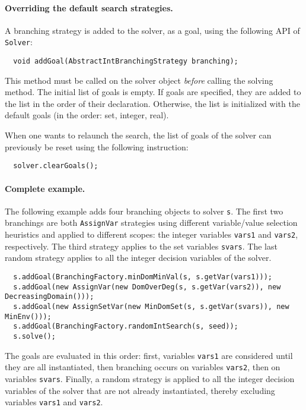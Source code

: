\paragraph{Overriding the default search strategies.}
A branching strategy is added to the solver, as a goal, using the following API of \texttt{Solver}:
\begin{lstlisting}
  void addGoal(AbstractIntBranchingStrategy branching);
\end{lstlisting}
This method must be called on the solver object \emph{before} calling the solving method.
The initial list of goals is empty. If goals are specified, they are added to the list in the order of their declaration.
Otherwise, the list is initialized with the default goals (in the order: set, integer, real).

When one wants to relaunch the search, the list of goals of the solver can previously be reset using the following instruction:
\begin{lstlisting}
  solver.clearGoals();
\end{lstlisting} 

\paragraph{Complete example.}
The following example adds four branching objects to solver \texttt{s}. 
The first two branchings are both \texttt{AssignVar} strategies using different variable/value selection heuristics and applied to different scopes: the integer variables \texttt{vars1} and \texttt{vars2}, respectively. The third strategy applies to the set variables \texttt{svars}. The last random strategy applies to all the integer decision variables of the solver.
\begin{lstlisting}
  s.addGoal(BranchingFactory.minDomMinVal(s, s.getVar(vars1)));
  s.addGoal(new AssignVar(new DomOverDeg(s, s.getVar(vars2)), new DecreasingDomain()));
  s.addGoal(new AssignSetVar(new MinDomSet(s, s.getVar(svars)), new MinEnv()));
  s.addGoal(BranchingFactory.randomIntSearch(s, seed));
  s.solve();
\end{lstlisting}
The goals are evaluated in this order: first, variables \texttt{vars1} are considered until they are all instantiated, then branching occurs on variables \texttt{vars2}, then on variables \texttt{svars}. Finally, a random strategy is applied to all the integer decision variables of the solver that are not already instantiated, thereby excluding variables \texttt{vars1} and \texttt{vars2}.

